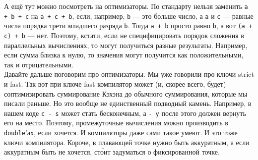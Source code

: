 \documentclass{article}
\begin{document}
    А ещё тут можно посмотреть на оптимизаторы. По стандарту нельзя заменить \texttt{a + b + c} на \texttt{a + c + b}, если, например, \texttt{b} --- это больше число, а \texttt{a} и \texttt{c} --- равные числа порядка трети младшего разряда \texttt{b}. Тогда \texttt{a + b} просто равно \texttt{b}, а вот \texttt{(a + c) + b} --- нет. Поэтому, кстати, если не специфицировать порядок сложения в параллельных вычислениях, то могут получиться разные результаты. Например, если сумма близка к нулю, то значения могут получится как положительными, так и отрицательными.\\
    Давайте дальше поговорим про оптимизаторы. Мы уже говорили про ключи strict и fast. Так вот при ключе fast компилятор может (и, скорее всего, будет) соптимизировать суммирование Кэхэна до обычного суммирования, которые мы писали раньше. Но это вообще не единственный подводный камень. Например, в нашем коде \texttt{c - s} может стать бесконечным, а \texttt{- y} после этого должен вернуть его на место. Поэтому, промежуточные вычисления можно производить в \texttt{double}'ах, если хочется. И компиляторы даже сами такое умеют. И это тоже ключи компилятора. Короче, в плавающей точке нужно быть аккуратным, а если аккуратным быть не хочется, ст\'{о}ит задуматься о фиксированной точке.
\end{document}
